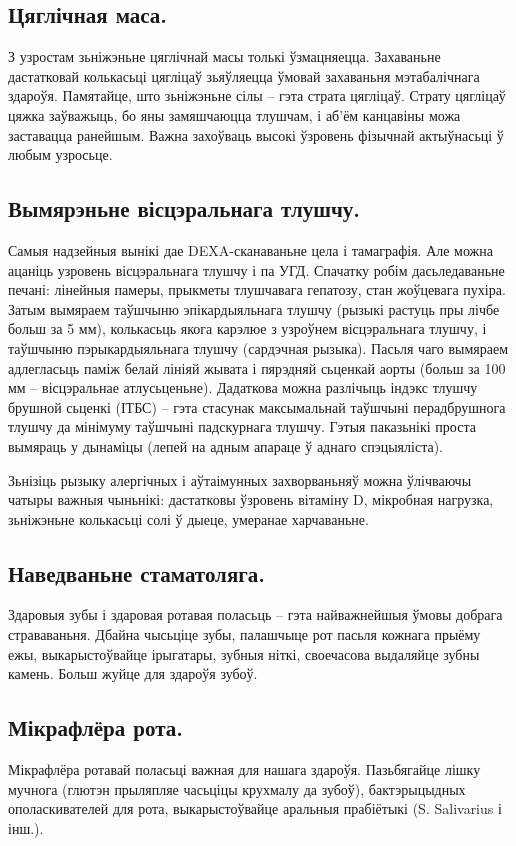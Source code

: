 \subsection{Цяглічная маса.}
З узростам зьніжэньне цяглічнай масы толькі ўзмацняецца. Захаваньне дастатковай колькасьці цягліцаў зьяўляецца ўмовай захаваньня мэтабалічнага здароўя. Памятайце, што зьніжэньне сілы – гэта страта цягліцаў. Страту цягліцаў цяжка заўважыць, бо яны замяшчаюцца тлушчам, і аб'ём канцавіны можа заставацца ранейшым. Важна захоўваць высокі ўзровень фізычнай актыўнасьці ў любым узросьце.

\subsection{Вымярэньне вісцэральнага тлушчу.}
Самыя надзейныя вынікі дае DEXA-сканаваньне цела і тамаграфія. Але можна ацаніць узровень вісцэральнага тлушчу і па УГД. Спачатку робім дасьледаваньне печані: лінейныя памеры, прыкметы тлушчавага гепатозу, стан жоўцевага пухіра. Затым вымяраем таўшчыню эпікардыяльнага тлушчу (рызыкі растуць пры лічбе больш за 5 мм), колькасьць якога карэлюе з узроўнем вісцэральнага тлушчу, і таўшчыню пэрыкардыяльнага тлушчу (сардэчная рызыка). Пасьля чаго вымяраем адлегласьць паміж белай лініяй жывата і пярэдняй сьценкай аорты (больш за 100 мм – вісцэральнае атлусьценьне). Дадаткова можна разлічыць індэкс тлушчу брушной сьценкі (ІТБС) – гэта стасунак максымальнай таўшчыні перадбрушнога тлушчу да мінімуму таўшчыні падскурнага тлушчу. Гэтыя паказьнікі проста вымяраць у дынаміцы (лепей на адным апараце ў аднаго спэцыяліста).

Зьнізіць рызыку алергічных і аўтаімунных захворваньняў можна ўлічваючы чатыры важныя чыньнікі: дастатковы ўзровень вітаміну D, мікробная нагрузка, зьніжэньне колькасьці солі ў дыеце, умеранае харчаваньне.

\subsection{Наведваньне стаматоляга.}
Здаровыя зубы і здаровая ротавая поласьць – гэта найважнейшыя ўмовы добрага страваваньня. Дбайна чысьціце зубы, палашчыце рот пасьля кожнага прыёму ежы, выкарыстоўвайце ірыгатары, зубныя ніткі, своечасова выдаляйце зубны камень. Больш жуйце для здароўя зубоў.

\subsection{Мікрафлёра рота.}
Мікрафлёра ротавай поласьці важная для нашага здароўя. Пазьбягайце лішку мучнога (глютэн прыляпляе часьціцы крухмалу да зубоў), бактэрыцыдных ополаскивателей для рота, выкарыстоўвайце аральныя прабіётыкі (S. Salivarius і інш.).

